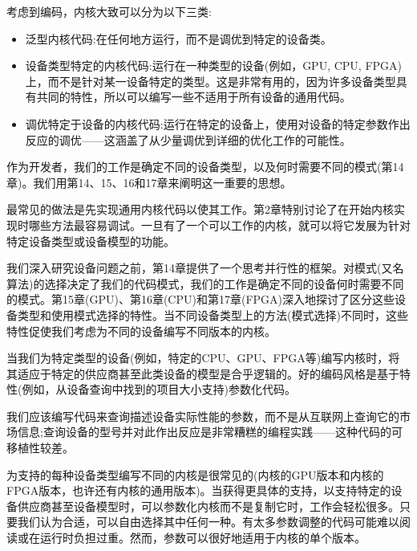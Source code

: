 考虑到编码，内核大致可以分为以下三类:\par

\begin{itemize}
	\item 泛型内核代码:在任何地方运行，而不是调优到特定的设备类。
	\item 设备类型特定的内核代码:运行在一种类型的设备(例如，GPU, CPU, FPGA)上，而不是针对某一设备特定的类型。这是非常有用的，因为许多设备类型具有共同的特性，所以可以编写一些不适用于所有设备的通用代码。
	\item 调优特定于设备的内核代码:运行在特定的设备上，使用对设备的特定参数作出反应的调优——这涵盖了从少量调优到详细的优化工作的可能性。
\end{itemize}

\begin{tcolorbox}[colback=red!5!white,colframe=red!75!black]
作为开发者，我们的工作是确定不同的设备类型，以及何时需要不同的模式(第14章)。我们用第14、15、16和17章来阐明这一重要的思想。
\end{tcolorbox}

最常见的做法是先实现通用内核代码以使其工作。第2章特别讨论了在开始内核实现时哪些方法最容易调试。一旦有了一个可以工作的内核，就可以将它发展为针对特定设备类型或设备模型的功能。\par

我们深入研究设备问题之前，第14章提供了一个思考并行性的框架。对模式(又名算法)的选择决定了我们的代码模式，我们的工作是确定不同的设备何时需要不同的模式。第15章(GPU)、第16章(CPU)和第17章(FPGA)深入地探讨了区分这些设备类型和使用模式选择的特性。当不同设备类型上的方法(模式选择)不同时，这些特性促使我们考虑为不同的设备编写不同版本的内核。\par

当我们为特定类型的设备(例如，特定的CPU、GPU、FPGA等)编写内核时，将其适应于特定的供应商甚至此类设备的模型是合乎逻辑的。好的编码风格是基于特性(例如，从设备查询中找到的项目大小支持)参数化代码。\par

我们应该编写代码来查询描述设备实际性能的参数，而不是从互联网上查询它的市场信息;查询设备的型号并对此作出反应是非常糟糕的编程实践——这种代码的可移植性较差。\par

为支持的每种设备类型编写不同的内核是很常见的(内核的GPU版本和内核的FPGA版本，也许还有内核的通用版本)。当获得更具体的支持，以支持特定的设备供应商甚至设备模型时，可以参数化内核而不是复制它时，工作会轻松很多。只要我们认为合适，可以自由选择其中任何一种。有太多参数调整的代码可能难以阅读或在运行时负担过重。然而，参数可以很好地适用于内核的单个版本。\par

